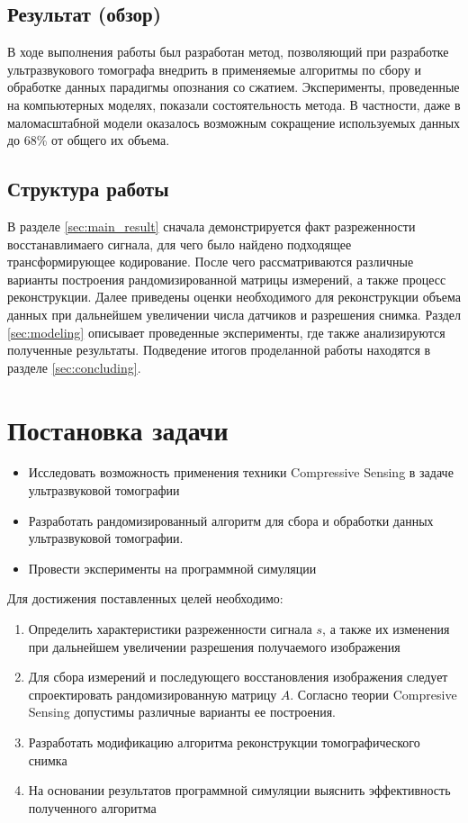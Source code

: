 \documentclass[14pt]{matmex-diploma}
\begin{document}
\subsection{Результат (обзор)}
В ходе выполнения работы был разработан метод, позволяющий при разработке ультразвукового томографа внедрить в применяемые алгоритмы по сбору и обработке данных парадигмы опознания со сжатием. Эксперименты, проведенные на компьютерных моделях, показали состоятельность метода. В частности, даже в маломасштабной модели оказалось возможным сокращение используемых данных до 68\% от общего их объема. 

\subsection{Структура работы}
В разделе \ref{sec:main_result} сначала демонстрируется факт разреженности восстанавлимаего сигнала, для чего было найдено подходящее трансформирующее кодирование. После чего рассматриваются различные варианты построения рандомизированной матрицы измерений, а также процесс реконструкции. Далее приведены оценки необходимого для реконструкции объема данных при дальнейшем увеличении числа датчиков и разрешения снимка. Раздел \ref{sec:modeling} описывает проведенные эксперименты, где также анализируются полученные результаты. Подведение итогов проделанной работы находятся в разделе \ref{sec:concluding}.

\section{Постановка задачи}
\begin{itemize}
  \item Исследовать возможность применения техники Compressive Sensing в задаче ультразвуковой томографии
  \item Разработать рандомизированный алгоритм для сбора и обработки данных ультразвуковой томографии. 
  \item Провести эксперименты на программной симуляции
\end{itemize}

Для достижения поставленных целей необходимо:
\begin{enumerate}
\item Определить характеристики разреженности сигнала $s$, а также их изменения при дальнейшем увеличении разрешения получаемого изображения
\item Для сбора измерений и последующего восстановления изображения следует спроектировать рандомизированную матрицу $A$. Согласно теории Compresive Sensing допустимы различные варианты ее построения. 
\item Разработать модификацию алгоритма реконструкции томографического снимка
\item На основании результатов программной симуляции выяснить эффективность полученного алгоритма
\end{enumerate}
\end{document}
